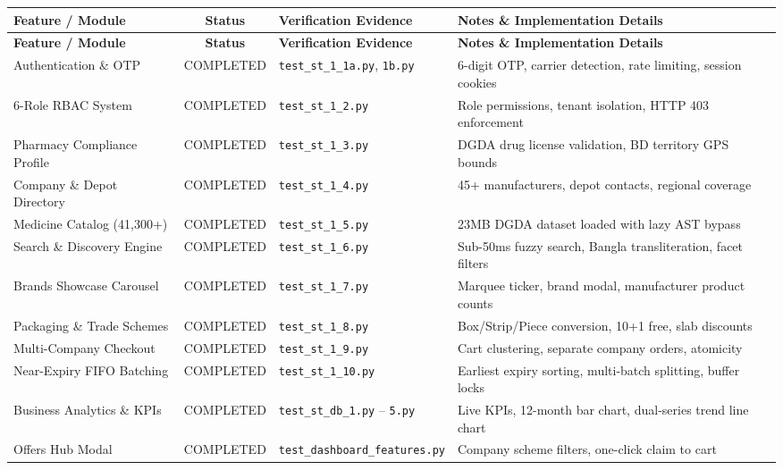 \documentclass[10pt,a4paper]{article}
\begin{document}
\noindent\begin{tabularx}{\textwidth}{p{3.6cm}cp{3.2cm}X}
\toprule
\textbf{Feature / Module} & \textbf{Status} & \textbf{Verification Evidence} & \textbf{Notes \& Implementation Details} \\
\midrule

\toprule
\textbf{Feature / Module} & \textbf{Status} & \textbf{Verification Evidence} & \textbf{Notes \& Implementation Details} \\
\midrule

\bottomrule

Authentication \& OTP & COMPLETED & \texttt{test\_st\_1\_1a.py}, \texttt{1b.py} & 6-digit OTP, carrier detection, rate limiting, session cookies \\
6-Role RBAC System & COMPLETED & \texttt{test\_st\_1\_2.py} & Role permissions, tenant isolation, HTTP 403 enforcement \\
Pharmacy Compliance Profile & COMPLETED & \texttt{test\_st\_1\_3.py} & DGDA drug license validation, BD territory GPS bounds \\
Company \& Depot Directory & COMPLETED & \texttt{test\_st\_1\_4.py} & 45+ manufacturers, depot contacts, regional coverage \\
Medicine Catalog (41,300+) & COMPLETED & \texttt{test\_st\_1\_5.py} & 23MB DGDA dataset loaded with lazy AST bypass \\
Search \& Discovery Engine & COMPLETED & \texttt{test\_st\_1\_6.py} & Sub-50ms fuzzy search, Bangla transliteration, facet filters \\
Brands Showcase Carousel & COMPLETED & \texttt{test\_st\_1\_7.py} & Marquee ticker, brand modal, manufacturer product counts \\
Packaging \& Trade Schemes & COMPLETED & \texttt{test\_st\_1\_8.py} & Box/Strip/Piece conversion, 10+1 free, slab discounts \\
Multi-Company Checkout & COMPLETED & \texttt{test\_st\_1\_9.py} & Cart clustering, separate company orders, atomicity \\
Near-Expiry FIFO Batching & COMPLETED & \texttt{test\_st\_1\_10.py} & Earliest expiry sorting, multi-batch splitting, buffer locks \\
Business Analytics \& KPIs & COMPLETED & \texttt{test\_st\_db\_1.py} -- \texttt{5.py} & Live KPIs, 12-month bar chart, dual-series trend line chart \\
Offers Hub Modal & COMPLETED & \texttt{test\_dashboard\_features.py} & Company scheme filters, one-click claim to cart \\

\end{tabularx}
\end{document}
